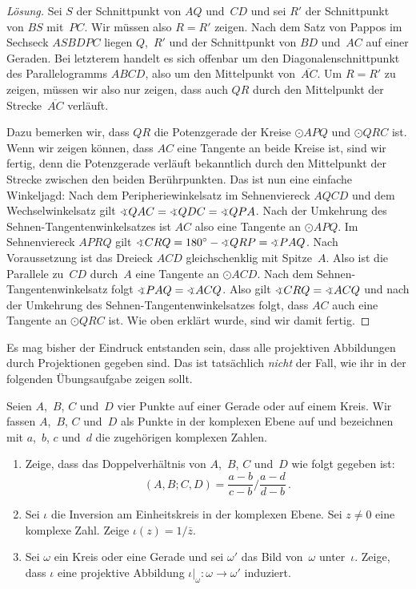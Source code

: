 \begin{proof}[Lösung]
	Sei $S$ der Schnittpunkt von $AQ$ und~$CD$ und sei $R'$ der Schnittpunkt von $BS$ mit~$PC$. Wir müssen also $R=R'$ zeigen. Nach dem Satz von Pappos im Sechseck $ASBDPC$ liegen $Q$,~$R'$ und der Schnittpunkt von $BD$ und~$AC$ auf einer Geraden. Bei letzterem handelt es sich offenbar um den Diagonalenschnittpunkt des Parallelogramms $ABCD$, also um den Mittelpunkt von~$\overline{AC}$. Um $R=R'$ zu zeigen, müssen wir also nur zeigen, dass auch $QR$ durch den Mittelpunkt der Strecke~$\overline{AC}$ verläuft.
	
	Dazu bemerken wir, dass $QR$ die Potenzgerade der Kreise $\odot APQ$ und $\odot QRC$ ist. Wenn wir zeigen können, dass $AC$ eine Tangente an beide Kreise ist, sind wir fertig, denn die Potenzgerade verläuft bekanntlich durch den Mittelpunkt der Strecke zwischen den beiden Berührpunkten. Das ist nun eine einfache Winkeljagd: Nach dem Peripheriewinkelsatz im Sehnenviereck $AQCD$ und dem Wechselwinkelsatz gilt $\winkel QAC=\winkel QDC=\winkel QPA$. Nach der Umkehrung des Sehnen-Tangentenwinkelsatzes ist $AC$ also eine Tangente an $\odot APQ$. Im Sehnenviereck $APRQ$ gilt $\winkel CRQ=180^\circ-\winkel QRP=\winkel PAQ$. Nach Voraussetzung ist das Dreieck $ACD$ gleichschenklig mit Spitze~$A$. Also ist die Parallele zu~$CD$ durch~$A$ eine Tangente an $\odot ACD$. Nach dem Sehnen-Tangentenwinkelsatz folgt $\winkel PAQ=\winkel ACQ$. Also gilt $\winkel CRQ=\winkel ACQ$ und nach der Umkehrung des Sehnen-Tangentenwinkelsatzes folgt, dass $AC$ auch eine Tangente an $\odot QRC$ ist. Wie oben erklärt wurde, sind wir damit fertig.
\end{proof}


Es mag bisher der Eindruck entstanden sein, dass alle projektiven Abbildungen durch Projektionen gegeben sind. Das ist tatsächlich \emph{nicht} der Fall, wie ihr in der folgenden Übungsaufgabe zeigen sollt.

\begin{aufgabe*}
	Seien $A$,~$B$, $C$ und~$D$ vier Punkte auf einer Gerade oder auf einem Kreis. Wir fassen $A$,~$B$, $C$ und~$D$ als Punkte in der komplexen Ebene auf und bezeichnen mit $a$,~$b$, $c$ und~$d$ die zugehörigen komplexen Zahlen.
	\begin{enumerate}
		\item Zeige, dass das Doppelverhältnis von $A$,~$B$, $C$ und~$D$ wie folgt gegeben ist:
		\begin{equation*}
			(A,B;C,D)=\frac{a-b}{c-b}\bigg/\frac{a-d}{d-b}\,.
		\end{equation*}
		\item Sei $\iota$ die Inversion am Einheitskreis in der komplexen Ebene. Sei $z\neq 0$ eine komplexe Zahl. Zeige $\iota(z)=1/\overline{z}$.
		\item Sei $\omega$ ein Kreis oder eine Gerade und sei $\omega'$ das Bild von~$\omega$ unter~$\iota$. Zeige, dass $\iota$ eine projektive Abbildung $\iota|_{\omega}\colon \omega\to\omega'$ induziert.
	\end{enumerate}
\end{aufgabe*}

